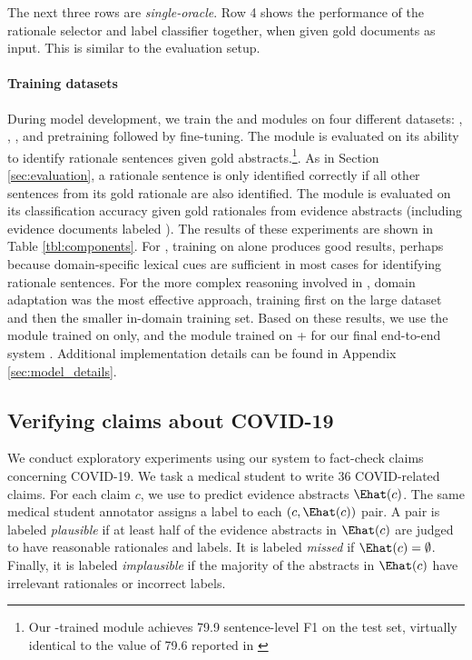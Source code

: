 The next three rows are \emph{single-oracle}. Row 4 shows the performance of the rationale selector and label classifier together, when given gold documents as input. This is similar to the \eraser evaluation setup.

\paragraph{Training datasets} During model development, we train the \componenttwo and \componentthree modules on four different datasets: \fever, \snopes, \ours, and \fever pretraining followed by \ours fine-tuning. The \componenttwo module is evaluated on its ability to identify rationale sentences given gold abstracts.\footnote{Our \fever-trained \componenttwo module achieves 79.9 sentence-level F1 on the \fever test set, virtually identical to the value of 79.6 reported in \citet{DeYoung2019ERASERAB}}. As in Section \ref{sec:evaluation}, a rationale sentence is only identified correctly if all other sentences from its gold rationale are also identified. The \componentthree module is evaluated on its classification accuracy given gold rationales from evidence abstracts (including evidence documents labeled \notenough). The results of these experiments are shown in Table \ref{tbl:components}. For \componenttwo, training on \ours alone produces good results, perhaps because domain-specific lexical cues are sufficient in most cases for identifying rationale sentences. For the more complex reasoning involved in \componentthree, domain adaptation was the most effective approach, training first on the large \fever dataset and then the smaller in-domain \ours training set. Based on these results, we use the \componenttwo module trained on \ours only, and the \componentthree module trained on \fever + \ours for our final end-to-end system \sysname. Additional implementation details can be found in Appendix \ref{sec:model_details}.




\subsection{Verifying claims about COVID-19}

We conduct exploratory experiments using our system to fact-check claims concerning COVID-19. We task a medical student to write 36 COVID-related claims. For each claim $c$, we use \sysname to predict evidence abstracts $\Ehat(c)$. The same medical student annotator assigns a label to each $(c, \Ehat(c))$ pair. A pair is labeled \emph{plausible} if at least half of the evidence abstracts in $\Ehat(c)$ are judged to have reasonable rationales and labels. It is labeled \emph{missed} if $\Ehat(c) = \emptyset$. Finally, it is labeled \emph{implausible} if the majority of the abstracts in $\Ehat(c)$ have irrelevant rationales or incorrect labels.

